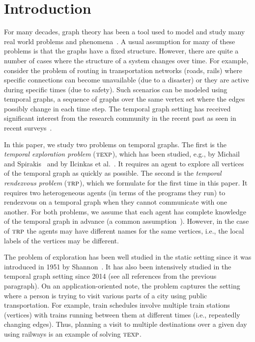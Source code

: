 \documentclass[10pt,a4paper]{article}
\newcommand{\trp}{\textsc{trp}}
\newcommand{\texp}{\textsc{texp}}
\begin{document}
\section{Introduction}
\label{sec:int}

For many decades, graph theory has been a tool used to model and study many real
world problems and phenomena~\cite{BondyM76}. A usual assumption for many of
these problems is that the graphs have a fixed structure. However, there are
quite a number of cases where the structure of a system changes over time. For
example, consider the problem of routing in transportation networks (roads,
rails) where specific connections can become unavailable (due to a disaster) or
they are active during specific times (due to safety). Such scenarios can be
modeled using temporal graphs, a sequence of graphs over the same vertex set
where the edges possibly change in each time step. The temporal graph setting
has received significant interest from the research community in the recent past
as seen in recent surveys~\cite{CasteigtsFQS12,Michail16}. 

In this paper, we study two problems on temporal graphs. The first is the
\textit{temporal exploration problem} ($\texp$), which has been studied, e.g., by Michail and
Spirakis~\cite{MichailS14,MichailS16} and by Ilcinkas et
al.~\cite{IlcinkasKW14}. It requires an agent to explore all vertices of the
temporal graph as quickly as possible. The second is the \textit{temporal
rendezvous problem} ($\trp$), which we formulate for the first time in this
paper. It requires two heterogeneous agents (in terms of the programs they run)
to rendezvous on a temporal graph when they cannot communicate with one another.
For both problems, we assume that each  agent has complete knowledge of the
temporal graph in advance (a common
assumption~\cite{AdamsonGMZ22,BodlaenderV19,ErlebachHK21,ErlebachKLSS19,ErlebachS22a,ErlebachS22b,IlcinkasKW14,MichailS14,MichailS16,Taghian20}).
However, in the case of $\trp$ the agents may have different names for the same
vertices, i.e., the local labels of the vertices may be different. 

The problem of exploration has been well studied in the static setting since it was introduced in 1951 by Shannon~\cite{Shannon51}.  
It has also been intensively studied in the temporal graph setting since
2014 (see all references from the previous paragraph).
On an application-oriented note, the problem captures the setting where a person
is trying to visit various parts of a city using %
public
transportation. For example, train schedules involve multiple train
stations (vertices) with trains running between them at different times (i.e.,
repeatedly
changing edges). Thus, planning a visit to multiple destinations
over a given day using railways is an example of solving $\texp$.
\end{document}
